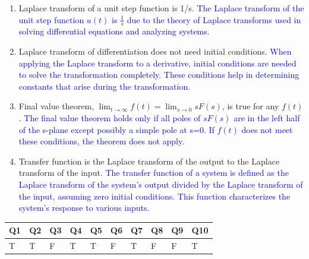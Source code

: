\documentclass{article}
\begin{document}
\begin{enumerate}
	      \textcolor{blue}{The Laplace transform is a linear operator. This means if you apply the Laplace transform to a linear combination of functions, the result is the same linear combination of the Laplace transforms of those functions.}
	\item Laplace transform of a unit step function is 1/s.\newline
	      \textcolor{blue}{The Laplace transform of the unit step function \( u(t) \) is \( \frac{1}{s} \) due to the theory of Laplace transforms used in solving differential equations and analyzing systems.}
	\item Laplace transform of differentiation does not need initial conditions.\newline
	      \textcolor{blue}{When applying the Laplace transform to a derivative, initial conditions are needed to solve the transformation completely. These conditions help in determining constants that arise during the transformation.}
	\item Final value theorem, $\lim_{t \to \infty} f(t) = \lim_{s \to 0} sF(s)$, is true for any $f(t)$.\newline
	      \textcolor{blue}{The final value theorem holds only if all poles of \( sF(s) \) are in the left half of the s-plane except possibly a simple pole at s=0. If \( f(t) \) does not meet these conditions, the theorem does not apply.}
	\item Transfer function is the Laplace transform of the output to the Laplace transform of the input.\newline
	      \textcolor{blue}{The transfer function of a system is defined as the Laplace transform of the system's output divided by the Laplace transform of the input, assuming zero initial conditions. This function characterizes the system's response to various inputs.}
	      	      
\end{enumerate}
\begin{center}
	\noindent %
	\begin{tabularx}{\textwidth}{|*{10}{X|}} %
		\hline
		Q1 & Q2 & Q3 & Q4 & Q5 & Q6 & Q7 & Q8 & Q9 & Q10 \\ \hline
		T  & T  & F  & T  & T  & F  & T  & F  & F  & T   \\ 
		\hline
	\end{tabularx}
\end{center}
\end{document}
